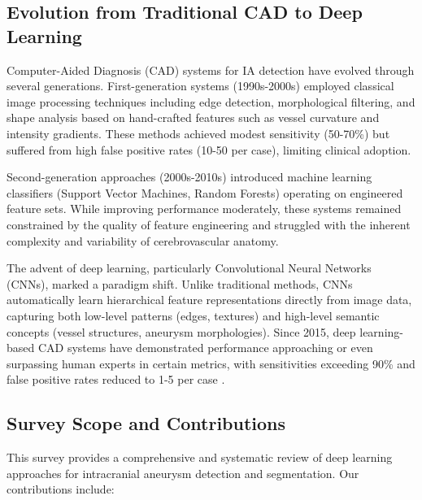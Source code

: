 \documentclass[conference]{IEEEtran}
\begin{document}
\subsection{Evolution from Traditional CAD to Deep Learning}

Computer-Aided Diagnosis (CAD) systems for IA detection have evolved through several generations. First-generation systems (1990s-2000s) employed classical image processing techniques including edge detection, morphological filtering, and shape analysis based on hand-crafted features such as vessel curvature and intensity gradients. These methods achieved modest sensitivity (50-70\%) but suffered from high false positive rates (10-50 per case), limiting clinical adoption.

Second-generation approaches (2000s-2010s) introduced machine learning classifiers (Support Vector Machines, Random Forests) operating on engineered feature sets. While improving performance moderately, these systems remained constrained by the quality of feature engineering and struggled with the inherent complexity and variability of cerebrovascular anatomy.

The advent of deep learning, particularly Convolutional Neural Networks (CNNs), marked a paradigm shift. Unlike traditional methods, CNNs automatically learn hierarchical feature representations directly from image data, capturing both low-level patterns (edges, textures) and high-level semantic concepts (vessel structures, aneurysm morphologies). Since 2015, deep learning-based CAD systems have demonstrated performance approaching or even surpassing human experts in certain metrics, with sensitivities exceeding 90\% and false positive rates reduced to 1-5 per case \cite{bo2021toward,park2019headxnet}.

\subsection{Survey Scope and Contributions}

This survey provides a comprehensive and systematic review of deep learning approaches for intracranial aneurysm detection and segmentation. Our contributions include:
\end{document}
